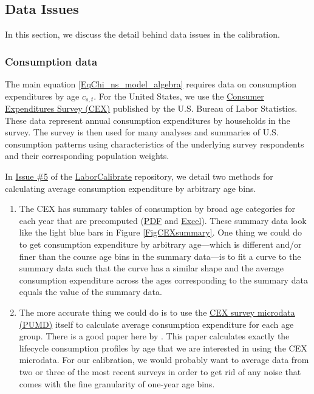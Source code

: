 \documentclass[letterpaper,12pt]{article}
\theoremstyle{definition}
\begin{document}
  \subsection{Data Issues}\label{SecData}

    In this section, we discuss the detail behind data issues in the calibration.


    \subsubsection{Consumption data}\label{SecDataCons}

      The main equation \eqref{EqChi_ns_model_algebra} requires data on consumption expenditures by age $c_{s,t}$. For the United States, we use the \href{https://www.bls.gov/cex/}{Consumer Expenditures Survey (CEX)} published by the U.S. Bureau of Labor Statistics. These data represent annual consumption expenditures by households in the survey. The survey is then used for many analyses and summaries of U.S. consumption patterns using characteristics of the underlying survey respondents and their corresponding population weights.

      In \href{https://github.com/OpenSourceMacro/LaborCalibrate/issues/5}{Issue \#5} of the \href{https://github.com/OpenSourceMacro/LaborCalibrate}{LaborCalibrate} repository, we detail two methods for calculating average consumption expenditure by arbitrary age bins.

      \begin{enumerate}
        \item The CEX has summary tables of consumption by broad age categories for each year that are precomputed (\href{https://www.bls.gov/cex/2016/combined/age.pdf}{PDF} and \href{https://www.bls.gov/cex/2016/combined/age.xlsx}{Excel}). These summary data look like the light blue bars in Figure \ref{FigCEXsummary}. One thing we could do to get consumption expenditure by arbitrary age---which is different and/or finer than the course age bins in the summary data---is to fit a curve to the summary data such that the curve has a similar shape and the average consumption expenditure across the ages corresponding to the summary data equals the value of the summary data.

        \item The more accurate thing we could do is to use the \href{https://www.bls.gov/cex/pumd.htm}{CEX survey microdata (PUMD)} itself to calculate average consumption expenditure for each age group. There is a good paper here by \citet{VillaverdeKrueger:2007}. This paper calculates exactly the lifecycle consumption profiles by age that we are interested in using the CEX microdata. For our calibration, we would probably want to average data from two or three of the most recent surveys in order to get rid of any noise that comes with the fine granularity of one-year age bins.
      \end{enumerate}
\end{document}
